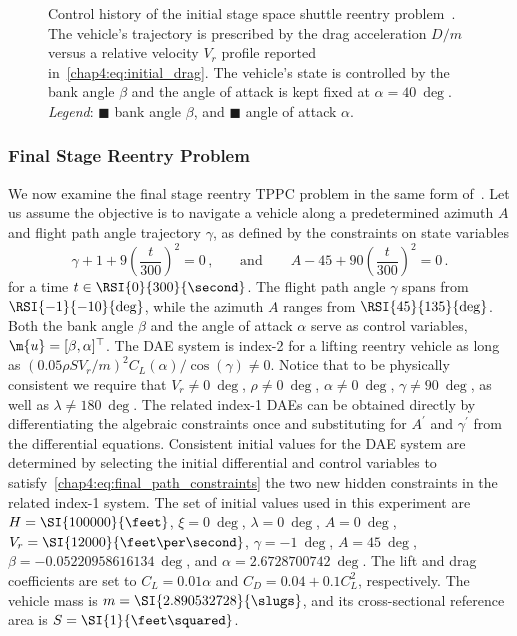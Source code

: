 \begin{figure}[htb]
  \centering
  \small{}
  \caption{Control history of the initial stage space shuttle reentry problem~\cite{brenan1995numerical}. The vehicle's trajectory is prescribed by the drag acceleration $D/m$ versus a relative velocity $V_r$ profile reported in~\eqref{chap4:eq:initial_drag}. The vehicle's state is controlled by the bank angle $\beta$ and the angle of attack is kept fixed at $\alpha = \SI{40}{\deg}$. \emph{Legend}: \textcolor{mycolor1}{$\blacksquare$} bank angle $\beta$, and \textcolor{mycolor2}{$\blacksquare$} angle of attack $\alpha$.}
  \label{chap4:fig:tppc_initial}
\end{figure}

\subsubsection{Final Stage Reentry Problem}

We now examine the final stage reentry \ac{TPPC} problem in the same form of~\cite{brenan1995numerical}. Let us assume the objective is to navigate a vehicle along a predetermined azimuth $A$ and flight path angle trajectory $\gamma$, as defined by the constraints on state variables
%
\begin{equation}
  \gamma + 1 + 9\left(\dfrac{t}{300}\right)^2 = 0 \, \text{,}
  \qquad \text{and} \qquad
  A - 45 + 90\left(\dfrac{t}{300}\right)^2 = 0 \, \text{.}
  \label{chap4:eq:final_path_constraints}
\end{equation}
%
for a time $t \in \RSI{0}{300}{\second}$. The flight path angle $\gamma$ spans from $\RSI{-1}{-10}{\deg}$, while the azimuth $A$ ranges from $\RSI{45}{135}{\deg}$. Both the bank angle $\beta$ and the angle of attack $\alpha$ serve as control variables, \ie{} $\m{u} = [\beta, \alpha]^\top$. The \ac{DAE} system is index-2 for a lifting reentry vehicle as long as $(0.05 \rho S V_r/m)^2 C_L(\alpha)/\cos(\gamma) \neq 0$. Notice that to be physically consistent we require that $V_r \neq \SI{0}{\deg}$, $\rho\neq \SI{0}{\deg}$, $\alpha \neq \SI{0}{\deg}$, $\gamma \neq \SI{90}{\deg}$, as well as $\lambda \neq \SI{180}{\deg}$. The related index-1 \acp{DAE} can be obtained directly by differentiating the algebraic constraints once and substituting for $A^\prime$ and $\gamma^\prime$ from the differential equations. Consistent initial values for the \ac{DAE} system are determined by selecting the initial differential and control variables to satisfy~\eqref{chap4:eq:final_path_constraints} the two new hidden constraints in the related index-1 system. The set of initial values used in this experiment are $H = \SI{100000}{\feet}$, $\xi = \SI{0}{\deg}$, $\lambda = \SI{0}{\deg}$, $A = \SI{0}{\deg}$, $V_r = \SI{12000}{\feet\per\second}$, $\gamma = \SI{-1}{\deg}$, $A = \SI{45}{\deg}$, $\beta = \SI{-0.05220958616134}{\deg}$, and $\alpha = \SI{2.6728700742}{\deg}$. The lift and drag coefficients are set to $C_L = 0.01\alpha$ and $C_D = 0.04 + 0.1C_L^2$, respectively. The vehicle mass is $m = \SI{2.890532728}{\slugs}$, and its cross-sectional reference area is $S = \SI{1}{\feet\squared}$.

